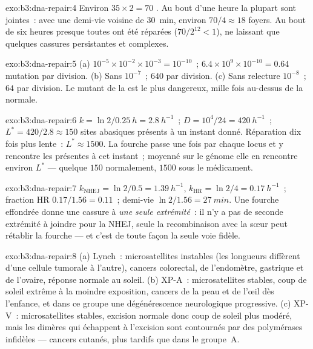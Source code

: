 \begin{solution}{exo:b3:dna-repair:4}
Environ $35\times 2 = 70$ . Au bout d'une heure la
plupart sont jointes~: avec une demi-vie voisine de \qty{30}{min},
environ $70/4 \approx 18$ foyers. Au bout de six heures presque toutes
ont été réparées ($70/2^{12} < 1$), ne laissant que quelques cassures
persistantes et complexes.
\end{solution}

\begin{solution}{exo:b3:dna-repair:5}
(a) $10^{-5}\times 10^{-2}\times 10^{-3} = 10^{-10}$~; $6.4\times
10^{9}\times 10^{-10} = 0.64$ mutation par division. (b) Sans
 $10^{-7}$~; $640$ par division. (c) Sans
relecture $10^{-8}$~; $64$ par division. Le mutant de la  est le plus dangereux, mille fois au-dessus de la
normale.
\end{solution}

\begin{solution}{exo:b3:dna-repair:6}
$k = \ln 2/\qty{0.25}{h} = \qty{2.8}{h^{-1}}$~; $D = 10^{4}/24 =
\qty{420}{h^{-1}}$~; $L^{*} = 420/2.8 \approx 150$ sites abasiques
présents à un instant donné. Réparation dix fois plus lente~:
$L^{*} \approx \num{1500}$. La fourche passe une fois par chaque locus et y
rencontre les  présentes à cet instant~; moyenné sur le génome
elle en rencontre environ $L^{*}$ --- quelque $150$ normalement,
$\num{1500}$ sous le médicament.
\end{solution}

\begin{solution}{exo:b3:dna-repair:7}
$k_{\text{NHEJ}} = \ln 2/0.5 = \qty{1.39}{h^{-1}}$, $k_{\text{HR}} =
\ln 2/4 = \qty{0.17}{h^{-1}}$~; fraction HR $0.17/1.56 = 0.11$~;
demi-vie $\ln 2/1.56 = \qty{27}{min}$. Une fourche effondrée donne une
cassure à \emph{une seule extrémité}~: il n'y a pas de seconde
extrémité à joindre pour la NHEJ, seule la recombinaison avec la sœur
peut rétablir la fourche --- et c'est de toute façon la seule voie
fidèle.
\end{solution}

\begin{solution}{exo:b3:dna-repair:8}
(a) Lynch~: microsatellites instables (les longueurs diffèrent d'une
cellule tumorale à l'autre), cancers colorectal, de l'endomètre,
gastrique et de l'ovaire, réponse normale au soleil. (b) XP-A~:
microsatellites stables, coup de soleil extrême à la moindre
exposition, cancers de la peau et de l'œil dès l'enfance, et dans ce
groupe une dégénérescence neurologique progressive. (c) XP-V~:
microsatellites stables, excision normale donc coup de soleil plus
modéré, mais les dimères qui échappent à l'excision sont contournés par
des polymérases infidèles --- cancers cutanés, plus tardifs que dans le
groupe~A.
\end{solution}

